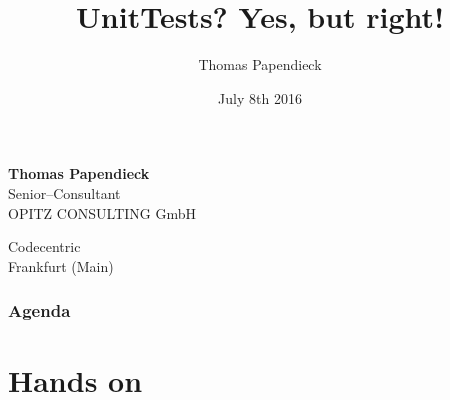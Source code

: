 \documentclass[aspectratio=169]{beamer}
\begin{document}
\title{UnitTests?  Yes, but right!}  
\author{Thomas Papendieck}
\date{July 8th 2016} 

\begin{frame}%

 
{ \textbf{Thomas Papendieck}\\Senior--Consultant\\\vspace{2em}OPITZ CONSULTING GmbH\vspace{2em}}

{Codecentric\\Frankfurt (Main)}
\end{frame}

\begin{frame}
\frametitle{Agenda}\tableofcontents
\end{frame} 


%







\section{Hands on}
\end{document}
